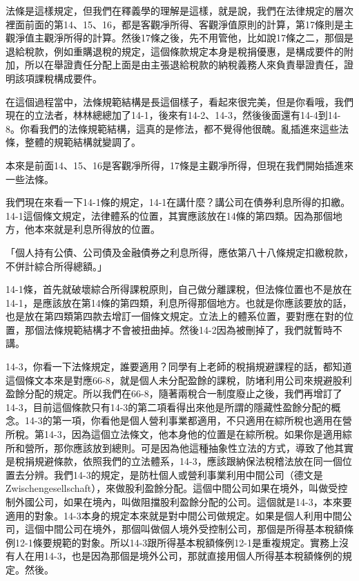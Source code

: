 \documentclass[]{ctexbook}
\begin{document}
法條是這樣規定，但我們在釋義學的理解是這樣，就是說，我們在法律規定的層次裡面前面的第14、15、16，都是客觀凈所得、客觀淨值原則的計算，第17條則是主觀淨值主觀淨所得的計算。然後17條之後，先不用管他，比如說17條之二，那個是退給稅款，例如重購退稅的規定，這個條款規定本身是稅捐優惠，是構成要件的附加，所以在舉證責任分配上面是由主張退給稅款的納稅義務人來負責舉證責任，證明該項課稅構成要件。

在這個過程當中，法條規範結構是長這個樣子，看起來很完美，但是你看哦，我們現在的立法者，林林總總加了14-1，後來有14-2、14-3，然後後面還有14-4到14-8。你看我們的法條規範結構，這真的是修法，都不覺得他很醜。亂插進來這些法條，整體的規範結構就變調了。

本來是前面14、15、16是客觀凈所得，17條是主觀凈所得，但現在我們開始插進來一些法條。

我們現在來看一下14-1條的規定，14-1在講什麼？講公司在債券利息所得的扣繳。14-1這個條文規定，法律體系的位置，其實應該放在14條的第四類。因為那個地方，他本來就是利息所得放的位置。

「個人持有公債、公司債及金融債券之利息所得，應依第八十八條規定扣繳稅款，不併計綜合所得總額。」

14-1條，首先就破壞綜合所得課稅原則，自己做分離課稅，但法條位置也不是放在14-1，是應該放在第14條的第四類，利息所得那個地方。也就是你應該要放的話，也是放在第四類第四款去增訂一個條文規定。立法上的體系位置，要對應在對的位置，那個法條規範結構才不會被扭曲掉。然後14-2因為被刪掉了，我們就暫時不講。

14-3，你看一下法條規定，誰要適用？同學有上老師的稅捐規避課程的話，都知道這個條文本來是對應66-8，就是個人未分配盈餘的課稅，防堵利用公司來規避股利盈餘分配的規定。所以我們在66-8，隨著兩稅合一制度廢止之後，我們再增訂了14-3，目前這個條款只有14-3的第二項看得出來他是所謂的隱藏性盈餘分配的概念。14-3的第一項，你看他是個人營利事業都適用，不只適用在綜所稅也適用在營所稅。第14-3，因為這個立法條文，他本身他的位置是在綜所稅。如果你是適用綜所和營所，那你應該放到總則。可是因為他這種抽象性立法的方式，導致了他其實是稅捐規避條款，依照我們的立法體系，14-3，應該跟納保法稅稽法放在同一個位置去分辨。我們14-3的規定，是防杜個人或營利事業利用中間公司（德文是Zwischengesellschaft），來做股利盈餘分配。這個中間公司如果在境外，叫做受控制外國公司，如果在境內，叫做阻擋股利盈餘分配的公司。這個就是14-3，本來要適用的對象。14-3本身的規定本來就是對中間公司做規定。如果是個人利用中間公司，這個中間公司在境外，那個叫做個人境外受控制公司，那個是所得基本稅額條例12-1條要規範的對象。所以14-3跟所得基本稅額條例12-1是重複規定。實務上沒有人在用14-3，也是因為那個是境外公司，那就直接用個人所得基本稅額條例的規定。然後。
\end{document}

